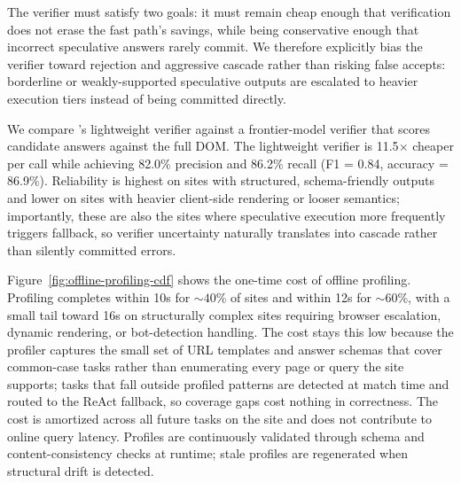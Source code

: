  The verifier must satisfy two goals: it must remain cheap enough that verification does not erase the fast path's savings, while being conservative enough that incorrect speculative answers rarely commit. We therefore explicitly bias the verifier toward rejection and aggressive cascade rather than risking false accepts: borderline or weakly-supported speculative outputs are escalated to heavier execution tiers instead of being committed directly.

We compare \sys's lightweight verifier against a frontier-model verifier that scores candidate answers against the full DOM. The lightweight verifier is 11.5$\times$ cheaper per call while achieving 82.0\% precision and 86.2\% recall (F1 = 0.84, accuracy = 86.9\%). Reliability is highest on sites with structured, schema-friendly outputs and lower on sites with heavier client-side rendering or looser semantics; importantly, these are also the sites where speculative execution more frequently triggers fallback, so verifier uncertainty naturally translates into cascade rather than silently committed errors.

Figure~\ref{fig:offline-profiling-cdf} shows the one-time cost
of offline profiling. Profiling completes within 10s for
${\sim}40$\% of sites and within 12s for ${\sim}60$\%, with a
small tail toward 16s on structurally complex sites requiring
browser escalation, dynamic rendering, or bot-detection
handling. The cost stays this low because the profiler captures
the small set of URL templates and answer schemas that cover
common-case tasks rather than enumerating every page or query
the site supports; tasks that fall outside profiled patterns
are detected at match time and routed to the ReAct fallback, so
coverage gaps cost nothing in correctness. The cost is amortized
across all future tasks on the site and does not contribute to
online query latency. Profiles are continuously validated
through schema and content-consistency checks at runtime; stale
profiles are regenerated when structural drift is detected.



